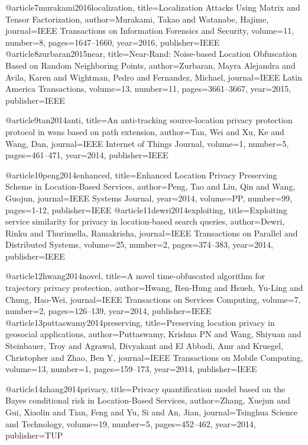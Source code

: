 {{{{{{@article{7murakami2016localization,
	title={Localization Attacks Using Matrix and Tensor Factorization},
	author={Murakami, Takao and Watanabe, Hajime},
	journal={IEEE Transactions on Information Forensics and Security},
	volume={11},
	number={8},
	pages={1647--1660},
	year={2016},
	publisher={IEEE}
}
@article{8zurbaran2015near,
	title={Near-Rand: Noise-based Location Obfuscation Based on Random Neighboring Points},
	author={Zurbaran, Mayra Alejandra and Avila, Karen and Wightman, Pedro and Fernandez, Michael},
	journal={IEEE Latin America Transactions},
	volume={13},
	number={11},
	pages={3661--3667},
	year={2015},
	publisher={IEEE}
}

@article{9tan2014anti,
	title={An anti-tracking source-location privacy protection protocol in wsns based on path extension},
	author={Tan, Wei and Xu, Ke and Wang, Dan},
	journal={IEEE Internet of Things Journal},
	volume={1},
	number={5},
	pages={461--471},
	year={2014},
	publisher={IEEE}
}

@article{10peng2014enhanced,
	title={Enhanced Location Privacy Preserving Scheme in Location-Based Services},
	author={Peng, Tao and Liu, Qin and Wang, Guojun},
	journal={IEEE Systems Journal},
	year={2014},
	volume={PP},
	number={99},
	pages={1-12},
	publisher={IEEE}
}
@article{11dewri2014exploiting,
	title={Exploiting service similarity for privacy in location-based search queries},
	author={Dewri, Rinku and Thurimella, Ramakrisha},
	journal={IEEE Transactions on Parallel and Distributed Systems},
	volume={25},
	number={2},
	pages={374--383},
	year={2014},
	publisher={IEEE}
}

@article{12hwang2014novel,
	title={A novel time-obfuscated algorithm for trajectory privacy protection},
	author={Hwang, Ren-Hung and Hsueh, Yu-Ling and Chung, Hao-Wei},
	journal={IEEE Transactions on Services Computing},
	volume={7},
	number={2},
	pages={126--139},
	year={2014},
	publisher={IEEE}
}
@article{13puttaswamy2014preserving,
	title={Preserving location privacy in geosocial applications},
	author={Puttaswamy, Krishna PN and Wang, Shiyuan and Steinbauer, Troy and Agrawal, Divyakant and El Abbadi, Amr and Kruegel, Christopher and Zhao, Ben Y},
	journal={IEEE Transactions on Mobile Computing},
	volume={13},
	number={1},
	pages={159--173},
	year={2014},
	publisher={IEEE}
}

@article{14zhang2014privacy,
	title={Privacy quantification model based on the Bayes conditional risk in Location-Based Services},
	author={Zhang, Xuejun and Gui, Xiaolin and Tian, Feng and Yu, Si and An, Jian},
	journal={Tsinghua Science and Technology},
	volume={19},
	number={5},
	pages={452--462},
	year={2014},
	publisher={TUP}
}

}}}}}}
